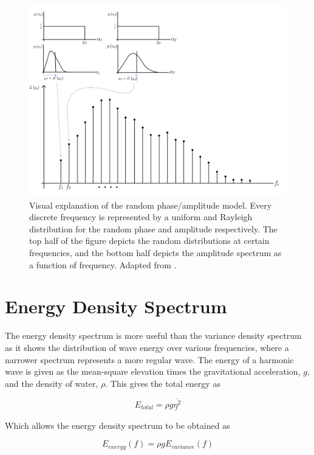\begin{figure}[H]
    \centering
    \includegraphics[width=.75\linewidth]{Figures/Theory/placeholder_randomModel.png}
    \caption{Visual explanation of the random phase/amplitude model. Every discrete frequency is represented by a uniform and Rayleigh distribution for the random phase and amplitude respectively. The top half of the figure depicts the random distributions at certain frequencies, and the bottom half depicts the amplitude spectrum as a function of frequency. Adapted from \cite{Holthuijsen2007}.}
    \label{fig:ap.randModel}
\end{figure}

\section{Energy Density Spectrum} \label{sec:sec:ap.oceanWaves.energySpectrum}
The energy density spectrum is more useful than the variance density spectrum as it shows the distribution of wave energy over various frequencies, where a narrower spectrum represents a more regular wave. The energy of a harmonic wave is given as the mean-square elevation times the gravitational acceleration, $g$, and the density of water, $\rho$. This gives the total energy as

\begin{equation} \label{eq:ap.waveSpectrum.totalEnergy}
   E_{total} = \rho g \overline{\underline{\eta}^{2}}
\end{equation}

Which allows the energy density spectrum to be obtained as

\begin{equation} \label{eq:ap.waveSpectrum.ESD}
   E_{energy}(f) = \rho g E_{variance}(f)
\end{equation}

